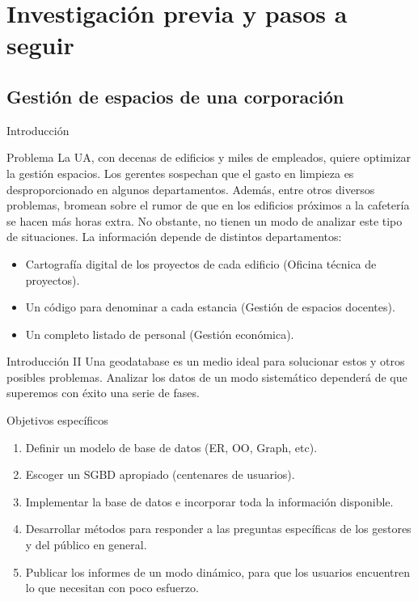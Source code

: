 \documentclass{classes/beamer_GeomaticaUA}
\begin{document}
\section[Caso práctico]{Investigación previa y pasos a seguir}
\subsection{Gestión de espacios de una corporación}
\begin{frame}{Introducción}
\begin{block}{Problema}
La UA, con decenas de edificios y miles de empleados, quiere optimizar la gestión espacios. Los gerentes sospechan que el gasto en limpieza es desproporcionado en algunos departamentos. Además, entre otros diversos problemas, bromean sobre el rumor de que en los edificios próximos a la cafetería se hacen más horas extra. No obstante, no tienen un modo de analizar este tipo de situaciones. La información depende de distintos departamentos:
\begin{itemize}
\item Cartografía digital de los proyectos de cada edificio (Oficina técnica de proyectos).
\item Un código para denominar a cada estancia (Gestión de espacios docentes).
\item Un completo listado de personal (Gestión económica).
\end{itemize}
\end{block}
\end{frame}

\begin{frame}{Introducción II}
Una geodatabase es un medio ideal para solucionar estos y otros posibles problemas. Analizar los datos de un modo sistemático dependerá de que superemos con éxito una serie de fases.

\begin{block}{Objetivos específicos}
\begin{enumerate}
\item Definir un modelo de base de datos (ER, OO, Graph, etc).
\item Escoger un SGBD apropiado (centenares de usuarios).
\item Implementar la base de datos e incorporar toda la información disponible.
\item Desarrollar métodos para responder a las preguntas específicas de los gestores y del público en general.
\item Publicar los informes de un modo dinámico, para que los usuarios encuentren lo que necesitan con poco esfuerzo.
\end{enumerate}
\end{block}
\end{frame}
\end{document}
